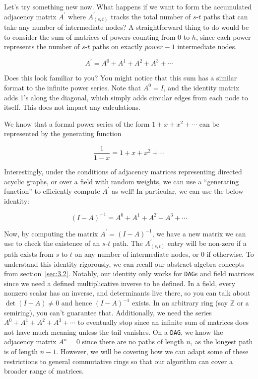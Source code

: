 \documentclass[12pt]{article}
\begin{document}
Let's try something new now. What happens if we want to form the accumulated adjacency matrix $A^{\prime}$ where $A^{\prime}_{(s, t)}$ tracks the total number of $s$-$t$ paths that can take any number of intermediate nodes? A straightforward thing to do would be to consider the sum of matrices of powers counting from 0 to $h$, since each power represents the number of $s$-$t$ paths on exactly $power - 1$ intermediate nodes.

\[
    A^{\prime} = A^0 + A^1 + A^2 + A^3 + \cdots
\]

Does this look familiar to you? You might notice that this sum has a similar format to the infinite power series. Note that $A^0 = I$, and the identity matrix adds 1's along the diagonal, which simply adds circular edges from each node to itself. This does not impact any calculations.

We know that a formal power series of the form $1 + x + x^2 + \cdots$ can be represented by the generating function

\[
    \frac{1}{1 - x} = 1 + x + x^2 + \cdots
\]

Interestingly, under the conditions of adjacency matrices representing directed acyclic graphs, or over a field with random weights, we can use a ``generating function'' to efficiently compute $A^{\prime}$ as well! In particular, we can use the below identity:

\[
    (I - A)^{-1} = A^0 + A^1 + A^2 + A^3 + \cdots
\]

Now, by computing the matrix $A^{\prime} = (I - A)^{-1}$, we have a new matrix we can use to check the existence of an $s$-$t$ path. The $A^{\prime}_{(s, t)}$ entry will be non-zero if a path exists from $s$ to $t$ on any number of intermediate nodes, or $0$ if otherwise. To understand this identity rigorously, we can recall our abstract algebra concepts from section~\ref{sec:3.2}. Notably, our identity only works for \texttt{DAG}s and field matrices since we need a defined multiplicative inverse to be defined. In a field, every nonzero scalar has an inverse, and determinants live there, so you can talk about $\det(I - A)\neq 0$ and hence $(I - A)^{-1}$ exists.  In an arbitrary ring (say \(\mathbb Z\) or a semiring), you can't guarantee that. Additionally, we need the series $A^0 + A^1 + A^2 + A^3 + \cdots$ to eventually stop since an infinite sum of matrices does not have much meaning unless the tail vanishes. On a \texttt{DAG}, we know the adjacency matrix $A^n = 0$ since there are no paths of length $n$, as the longest path is of length $n - 1$. However, we will be covering how we can adapt some of these restrictions to general commutative rings so that our algorithm can cover a broader range of matrices.
\end{document}
